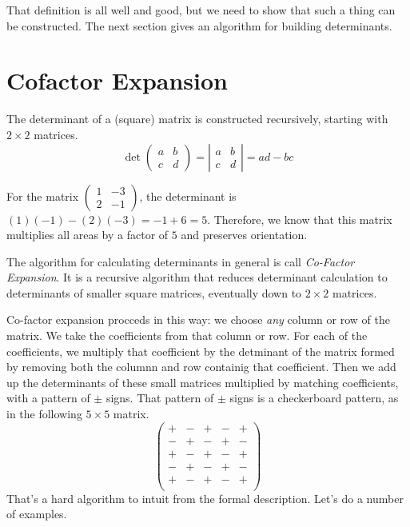 \documentclass[fleqn]{report}
\begin{document}
That definition is all well and good, but we need to show 
that such a thing can be constructed. The next section
gives an algorithm for building determinants.

\section{Cofactor Expansion}

The determinant of a (square) matrix is constructed
recursively, starting with $2 \times 2$ matrices. 
\begin{equation*}
\det \left( \begin{matrix} a & b \\ c & d \end{matrix} \right)
= 
\left| \begin{matrix} a & b \\ c & d \end{matrix} \right| =
ad-bc
\end{equation*}

\begin{example}
For the matrix $\left( \begin{matrix} 1 & -3 \\ 2 & -1
\end{matrix} \right)$, the determinant is $(1)(-1) - (2)(-3) =
-1 + 6 = 5$. Therefore, we know that this matrix multiplies
all areas by a factor of $5$ and preserves orientation.
\end{example}

\begin{defn}
The algorithm for calculating determinants in general is call
\emph{Co-Factor Expansion}. It is a recursive algorithm that
reduces determinant calculation to determinants of smaller
square matrices, eventually down to $2 \times 2$ matrices.
\end{defn}

Co-factor expansion procceds in this way: we choose \emph{any}
column or row of the matrix. We take the coefficients from
that column or row. For each of the coefficients, we multiply
that coefficient by the detminant of the matrix formed by
removing both the columnn and row containig that coefficient.
Then we add up the determinants of these small matrices
multiplied by matching coefficients, with a pattern of $\pm$
signs. That pattern of $\pm$ signs is a checkerboard pattern,
as in the following $5 \times 5$ matrix.
\begin{equation*}
\left( \begin{matrix}
+ & - & + & - & + \\
- & + & - & + & - \\
+ & - & + & - & + \\
- & + & - & + & - \\
+ & - & + & - & + \\
\end{matrix} \right) 
\end{equation*}
That's a hard algorithm to intuit from the formal description.
Let's do a number of examples. 
\end{document}
